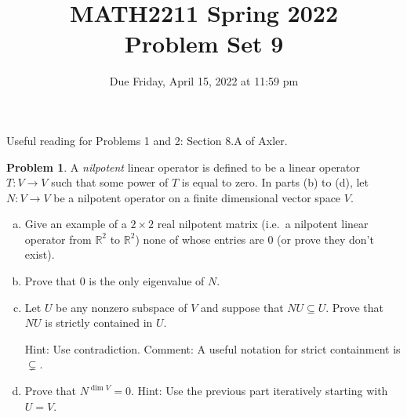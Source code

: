 \documentclass[11pt,oneside]{amsart}
\title{MATH2211 Spring 2022\\
Problem Set 9}
\author{Due Friday, April 15, 2022 at 11:59 pm}
\theoremstyle{definition}
\newtheorem{problem}{Problem}
\newcommand{\bR}{\mathbb{R}}
\begin{document}
    \maketitle

    Useful reading for Problems 1 and 2: Section 8.A of Axler.

    \begin{problem}
        A \emph{nilpotent} linear operator is defined to be a linear operator $T\colon V\to V$ such that some power of $T$ is equal to zero. In parts (b) to (d), let $N\colon V\to V$ be a nilpotent operator on a finite dimensional vector space $V$.
        \begin{enumerate}[(a)]
            \item Give an example of a $2\times 2$ real nilpotent matrix (i.e.\ a nilpotent linear operator from $\bR^2$ to $\bR^2$) none of whose entries are 0 (or prove they don't exist).
            \item Prove that 0 is the only eigenvalue of $N$.
            \item Let $U$ be any nonzero subspace of $V$ and suppose that $NU\subseteq U$. Prove that $NU$ is strictly contained in $U$.
            
            Hint: Use contradiction. Comment: A useful notation for strict containment is $\subsetneq$.
            \item Prove that $N^{\dim V}=0$. Hint: Use the previous part iteratively starting with $U=V$.
        \end{enumerate}
    \end{problem}
    
\end{document}
